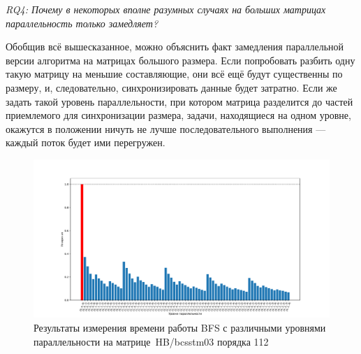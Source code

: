 \textit{RQ4: Почему в некоторых вполне разумных случаях на больших матрицах параллельность только замедляет?}

Обобщив всё вышесказанное, можно объяснить факт замедления параллельной версии алгоритма на матрицах большого размера. Если попробовать разбить одну такую матрицу на меньшие составляющие, они всё ещё будут существенны по размеру, и, следовательно, синхронизировать данные будет затратно. Если же задать такой уровень параллельности, при котором матрица разделится до частей приемлемого для синхронизации размера, задачи, находящиеся на одном уровне, окажутся в положении ничуть не лучше последовательного выполнения --- каждый поток будет ими перегружен.

\begin{landscape}
\begin{figure}
    \thispagestyle{empty} 
    \centering
    \includegraphics[height=0.8\textwidth]{figures/barPlot112.pdf}
    \caption{Результаты измерения времени работы BFS с различными уровнями параллельности на мат\-ри\-це~HB/bcsstm03 порядка 112\\}
    \label{fig:barPlot112}
\end{figure}
\end{landscape}

